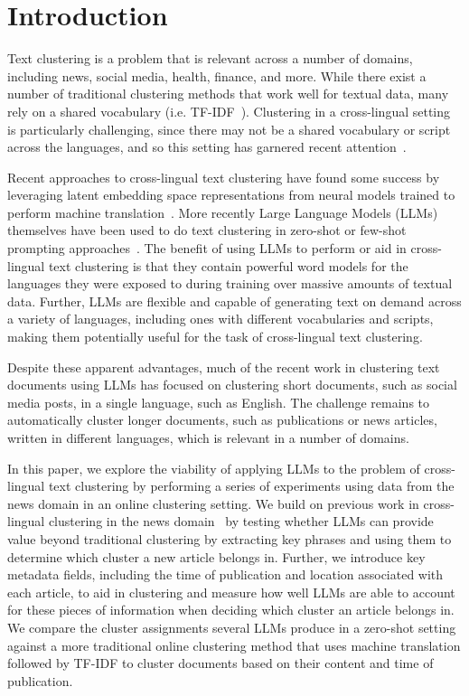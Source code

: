 \section{Introduction}\label{section:introduction}

Text clustering is a problem that is relevant across a number of domains, including news, social media, health, finance, and more.
While there exist a number of traditional clustering methods that work well for textual data, many rely on a shared vocabulary (i.e. TF-IDF~\cite{salton-buckley}).
Clustering in a cross-lingual setting is particularly challenging, since there may not be a shared vocabulary or script across the languages, and so this setting has garnered recent attention~\cite{Schneider2023}.

Recent approaches to cross-lingual text clustering have found some success by leveraging latent embedding space representations from neural models trained to perform machine translation~\cite{Schw18, Hong17,Pire19, Amma18}.
More recently Large Language Models (LLMs) themselves have been used to do text clustering in zero-shot or few-shot prompting approaches~\cite{Zhang2023clusterllm, Viswanathan2024}.
The benefit of using LLMs to perform or aid in cross-lingual text clustering is that they contain powerful word models for the languages they were exposed to during training over massive amounts of textual data.
Further, LLMs are flexible and capable of generating text on demand across a variety of languages, including ones with different vocabularies and scripts, making them potentially useful for the task of cross-lingual text clustering.

Despite these apparent advantages, much of the recent work in clustering text documents using LLMs has focused on clustering short documents, such as social media posts, in a single language, such as English.
The challenge remains to automatically cluster longer documents, such as publications or news articles, written in different languages, which is relevant in a number of domains.

In this paper, we explore the viability of applying LLMs to the problem of cross-lingual text clustering by performing a series of experiments using data from the news domain in an online clustering setting.
We build on previous work in cross-lingual clustering in the news domain~\cite{Schneider2023} by testing whether LLMs can provide value beyond traditional clustering by extracting key phrases and using them to determine which cluster a new article belongs in.
Further, we introduce key metadata fields, including the time of publication and location associated with each article, to aid in clustering and measure how well LLMs are able to account for these pieces of information when deciding which cluster an article belongs in.
We compare the cluster assignments several LLMs produce in a zero-shot setting against a more traditional online clustering method that uses machine translation followed by TF-IDF to cluster documents based on their content and time of publication.

